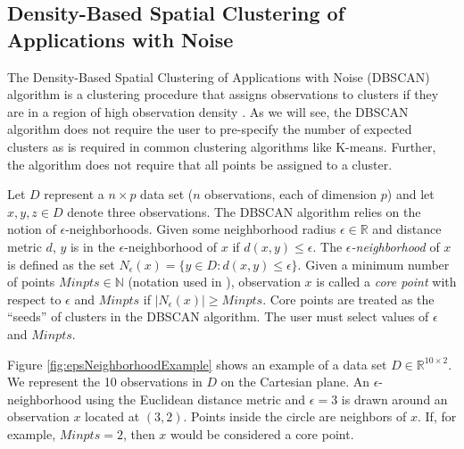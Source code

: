 \documentclass[11pt,]{isuthesis}
\begin{document}
\hypertarget{density-based-spatial-clustering-of-applications-with-noise}{%
\subsection{Density-Based Spatial Clustering of Applications with Noise}\label{density-based-spatial-clustering-of-applications-with-noise}}

The Density-Based Spatial Clustering of Applications with Noise (DBSCAN) algorithm is a clustering procedure that assigns observations to clusters if they are in a region of high observation density \citep{Ester1996}.
As we will see, the DBSCAN algorithm does not require the user to pre-specify the number of expected clusters as is required in common clustering algorithms like K-means.
Further, the algorithm does not require that all points be assigned to a cluster.

Let \(D\) represent a \(n \times p\) data set (\(n\) observations, each of dimension \(p\)) and let \(x,y,z \in D\) denote three observations.
The DBSCAN algorithm relies on the notion of \(\epsilon\)-neighborhoods.
Given some neighborhood radius \(\epsilon \in \mathbb{R}\) and distance metric \(d\), \(y\) is in the \(\epsilon\)-neighborhood of \(x\) if \(d(x,y) \leq \epsilon\).
The \emph{\(\epsilon\)-neighborhood} of \(x\) is defined as the set \(N_{\epsilon}(x) = \{y \in D : d(x,y) \leq \epsilon\}\).
Given a minimum number of points \(Minpts \in \mathbb{N}\) (notation used in \citep{Ester1996}), observation \(x\) is called a \emph{core point} with respect to \(\epsilon\) and \(Minpts\) if \(|N_{\epsilon}(x)| \geq Minpts\).
Core points are treated as the ``seeds'' of clusters in the DBSCAN algorithm.
The user must select values of \(\epsilon\) and \(Minpts\).

Figure \ref{fig:epsNeighborhoodExample} shows an example of a data set \(D \in \mathbb{R}^{10 \times 2}\).
We represent the 10 observations in \(D\) on the Cartesian plane.
An \(\epsilon\)-neighborhood using the Euclidean distance metric and \(\epsilon = 3\) is drawn around an observation \(x\) located at \((3,2)\).
Points inside the circle are neighbors of \(x\).
If, for example, \(Minpts = 2\), then \(x\) would be considered a core point.
\end{document}
